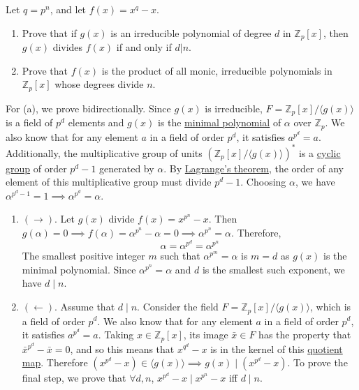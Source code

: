   \begin{exercise}[Shifrin 5.3.7]
    Let $q = p^n$, and let $f(x) = x^q - x$.
    \begin{enumerate}[label=\alph*.]
      \item Prove that if $g(x)$ is an irreducible polynomial of degree $d$ in $\mathbb{Z}_p[x]$, then $g(x)$ divides $f(x)$ if and only if $d|n$.
      \item Prove that $f(x)$ is the product of all monic, irreducible polynomials in $\mathbb{Z}_p[x]$ whose degrees divide $n$.
    \end{enumerate}
  \end{exercise}
  \begin{solution}
    For (a), we prove bidirectionally. Since $g(x)$ is irreducible, $F = \mathbb{Z}_p [x] / \langle g(x) \rangle$ is a field of $p^d$ elements and $g(x)$ is the \hyperref[def:min_poly]{minimal polynomial} of $\alpha$ over $\mathbb{Z}_p$. We also know that for any element $a$ in a field of order $p^d$, it satisfies $a^{p^d} = a$. Additionally, the multiplicative group of units $(\mathbb{Z}_p [x] / \langle g(x)\rangle)^\ast$ is a \hyperref[def:cyclic-group]{cyclic group} of order $p^d - 1$ generated by $\alpha$. By \hyperref[thm:lagranges-theorem]{Lagrange's theorem}, the order of any element of this multiplicative group must divide $p^d - 1$. Choosing $\alpha$, we have $\alpha^{p^d - 1} = 1 \implies \alpha^{p^d} = \alpha$.
    \begin{enumerate}
      \item $(\rightarrow)$. Let $g(x)$ divide $f(x) = x^{p^n} - x$. Then $g(\alpha) = 0 \implies f(\alpha) = \alpha^{p^n} - \alpha = 0 \implies \alpha^{p^n} = \alpha$. Therefore, 
      \begin{equation}
        \alpha = \alpha^{p^d} = \alpha^{p^n}
      \end{equation}
      The smallest positive integer $m$ such that $\alpha^{p^m} = \alpha$ is $m = d$ as $g(x)$ is the minimal polynomial. Since $\alpha^{p^n} = \alpha$ and $d$ is the smallest such exponent, we have $d \mid n$.  

      \item $(\leftarrow)$. Assume that $d \mid n$.
      Consider the field $F = \mathbb{Z}_p [x] / \langle g(x) \rangle$, which is a field of order $p^d$. We also know that for any element $a$ in a field of order $p^d$, it satisfies $a^{p^d} = a$. Taking $x \in \mathbb{Z}_p [x]$, its image $\bar{x} \in F$ has the property that $\bar{x}^{p^d} - \bar{x} = 0$, and so this means that $x^{q^d} - x$ is in the kernel of this \hyperref[pst-def:quotient-map]{quotient map}. Therefore $(x^{p^d} - x) \in \langle g(x) \rangle \implies g(x) \mid (x^{p^d} - x)$. To prove the final step, we prove that $\forall d, n$, $x^{p^d}  - x \mid x^{p^n} - x$ iff $d \mid n$. 
      

\end{enumerate}
\end{solution}
